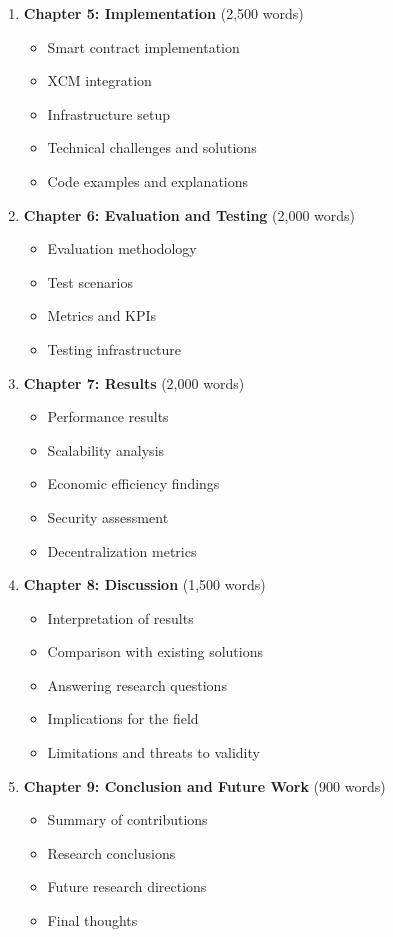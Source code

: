 \documentclass[12pt,a4paper]{article}
\begin{document}
\begin{enumerate}
    \item \textbf{Chapter 5: Implementation} (2,500 words)
    \begin{itemize}[label=--]
        \item Smart contract implementation
        \item XCM integration
        \item Infrastructure setup
        \item Technical challenges and solutions
        \item Code examples and explanations
    \end{itemize}
    
    \item \textbf{Chapter 6: Evaluation and Testing} (2,000 words)
    \begin{itemize}[label=--]
        \item Evaluation methodology
        \item Test scenarios
        \item Metrics and KPIs
        \item Testing infrastructure
    \end{itemize}
    
    \item \textbf{Chapter 7: Results} (2,000 words)
    \begin{itemize}[label=--]
        \item Performance results
        \item Scalability analysis
        \item Economic efficiency findings
        \item Security assessment
        \item Decentralization metrics
    \end{itemize}
    
    \item \textbf{Chapter 8: Discussion} (1,500 words)
    \begin{itemize}[label=--]
        \item Interpretation of results
        \item Comparison with existing solutions
        \item Answering research questions
        \item Implications for the field
        \item Limitations and threats to validity
    \end{itemize}
    
    \item \textbf{Chapter 9: Conclusion and Future Work} (900 words)
    \begin{itemize}[label=--]
        \item Summary of contributions
        \item Research conclusions
        \item Future research directions
        \item Final thoughts
    \end{itemize}
    

\end{enumerate}
\end{document}
